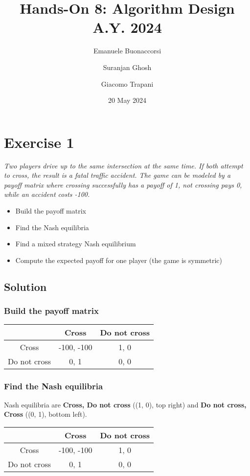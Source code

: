 \documentclass{article}
\title{Hands-On 8: Algorithm Design A.Y. 2024}
\author{Emanuele Buonaccorsi \and Suranjan Ghosh \and Giacomo Trapani}
\date{20 May 2024}
\begin{document}
\maketitle

\section{Exercise 1}
{\itshape
Two players drive up to the same intersection at the same time. If both attempt to cross, the
result is a fatal traffic accident. The game can be modeled by a payoff matrix where crossing
successfully has a payoff of 1, not crossing pays 0, while an accident costs -100.
\begin{itemize}
	\item Build the payoff matrix
	\item Find the Nash equilibria  
	\item Find a mixed strategy Nash equilibrium  
	\item Compute the expected payoff for one player (the game is symmetric)
\end{itemize}
}
\subsection{Solution}
\subsubsection*{Build the payoff matrix}
\begin{center}
	\begin{tabular}{|c|c|c|}
        \hline
        & Cross & Do not cross \\\hline
        Cross &  -100, -100 & 1, 0 \\\hline
        Do not cross & 0, 1 & 0, 0 \\\hline
  \end{tabular}
\end{center}

\subsubsection*{Find the Nash equilibria}
Nash equilibria are \textbf{Cross, Do not cross} ((1, 0), top right) and \textbf{Do not cross,
Cross} ((0, 1), bottom left).

\begin{center}
	\begin{tabular}{|c|c|c|}
        \hline
        & Cross & Do not cross \\\hline
        Cross &  -100, -100 & \cellcolor{green!30}1, 0 \\\hline
        Do not cross & \cellcolor{green!30}0, 1 & 0, 0 \\\hline
  \end{tabular}
\end{center}
\end{document}
